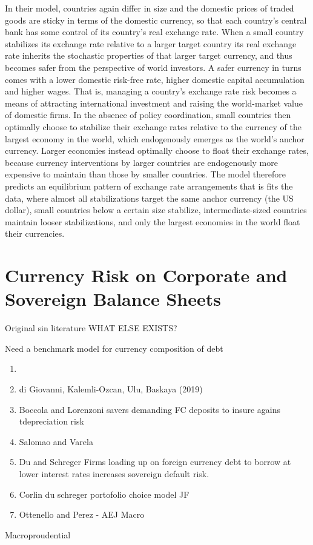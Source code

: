 \documentclass{ar-1col}
\begin{document}
In their model, countries again differ in size and the domestic prices of traded goods are sticky in terms of the domestic currency, so that each country's central bank has some control of its country's real exchange rate. When a small country stabilizes its exchange rate relative to a larger target country its real exchange rate inherits the stochastic properties of that larger target currency, and thus becomes safer from the perspective of world investors. A safer currency in turns comes with a lower domestic risk-free rate, higher domestic capital accumulation and higher wages. That is, managing a country's exchange rate risk becomes a means of attracting international investment and raising the world-market value of domestic firms. 
In the absence of policy coordination, small countries then optimally choose to
stabilize their exchange rates relative to the currency of the largest economy in the world,
which endogenously emerges as the world's anchor currency. Larger economies instead
optimally choose to 
float their exchange rates, because currency interventions by larger countries are endogenously more expensive to maintain than those by smaller countries. The model therefore predicts an equilibrium pattern of exchange rate arrangements that is fits the data, where almost all stabilizations target the same anchor currency (the US dollar), small countries below a certain size stabilize, intermediate-sized countries maintain looser stabilizations, and only the largest economies in the world float their currencies. 

\section{Currency Risk on Corporate and Sovereign Balance Sheets\label{sec_balancesheets}}
Original sin literature WHAT ELSE EXISTS?

Need a benchmark model for currency composition of debt
\begin{enumerate}
\item \citet{Richers2020}
\item di Giovanni, Kalemli-Ozcan, Ulu, Baskaya (2019)
\item Boccola and Lorenzoni savers demanding FC deposits to insure agains tdepreciation risk
\item Salomao and Varela
\item Du and Schreger Firms loading up on foreign currency debt to borrow at lower interest rates increases sovereign default risk.
\item Corlin du schreger portofolio choice model JF
\item Ottenello and Perez - AEJ Macro
\end{enumerate} 
Macroproudential
\end{document}
